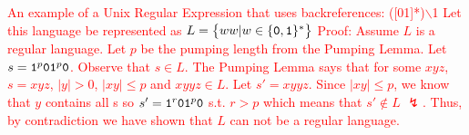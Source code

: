 \textcolor{red}{
    An example of a Unix Regular Expression that uses backreferences: ([01]*)$\backslash$1\newp
    Let this language be represented as $L = \big\{ww|w \in \{\texttt{0},\texttt{1}\}^*\big\}$\newp
    Proof: Assume $L$ is a regular language. Let $p$ be the pumping length from the Pumping Lemma. Let $s = \texttt{1}^p\texttt{01}^p\texttt{0}$. Observe that $s \in L$. The Pumping Lemma says that for some $xyz$, $s=xyz$, $|y| > 0$, $|xy| \leq p$ and $xyyz \in L$. Let $s' = xyyz$. Since $|xy| \leq p$, we know that $y$ contains all s so $s' = \texttt{1}^r\texttt{01}^p\texttt{0}$ s.t. $r > p$ which means that $s' \notin L$ $\lightning$. Thus, by contradiction we have shown that $L$ can not be a regular language.
}